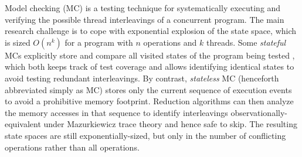 \documentclass{article}
\begin{document}
Model checking (MC) \cite{verisoft} is a testing technique for systematically executing and verifying
the possible thread interleavings of a concurrent program.
The main research challenge is to cope with exponential explosion of the state space,
which is sized $O(n^k)$ for a program with $n$ operations and $k$ threads.
Some {\em stateful} MCs explicitly store and compare all visited states of the program being tested \cite{spin},
which both keeps track of test coverage
and allows identifying identical states to avoid testing redundant interleavings.
%
By contrast, {\em stateless} MC (henceforth abbreviated simply as MC)
stores only the current sequence of execution events to avoid a prohibitive memory footprint.
Reduction algorithms \cite{dpor,optimal-dpor,satcheck,mcr,mcr,tsopso}
can then analyze the memory accesses in that sequence to identify
interleavings observationally-equivalent under Mazurkiewicz trace theory \cite{mazurkiewicz} and hence safe to skip.
The resulting state spaces are still exponentially-sized,
but only in the number of conflicting operations rather than all operations.
\end{document}
